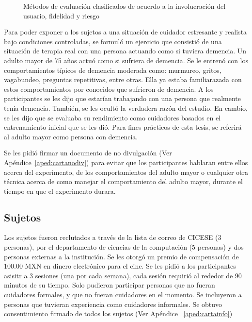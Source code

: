 \begin{figure}[h]
        \centering
        \caption{M\'etodos de evaluaci\'on clasificados de acuerdo a la involucraci\'on del usuario, fidelidad y riesgo}\label{fig:evalmethods}
\end{figure}


Para poder exponer a los sujetos a una situaci\'on de cuidador estresante y realista bajo condiciones controladas, se formul\'o un ejercicio que consisti\'o de una situaci\'on de terapia real con una persona actuando como si tuviera demencia. Un adulto mayor de 75 a\~nos actu\'o como si sufriera de demencia. Se le entren\'o con los comportamientos t\'ipicos de demencia moderada como: murmureo, gritos, vagabundeo, preguntas repetitivas, entre otras. Ella ya estaba familiarazada con estos comportamientos por conocidos que sufrieron de demencia. A los participantes se les dijo que estar\'ian trabajando con una persona que realmente ten\'ia demencia. Tambi\'en, se les ocult\'o la verdadera raz\'on del estudio. En cambio, se les dijo que se evaluaba su rendimiento como cuidadores basados en el entrenamiento inicial que se les di\'o. Para fines pr\'acticos de esta tesis, se referir\'a al adulto mayor como persona con demencia.

Se les pidi\'o firmar un documento de no divulgaci\'on (Ver Ap\'endice~\ref{aped:cartanodiv}) para evitar que los participantes hablaran entre ellos acerca del experimento, de los comportamientos del adulto mayor o cualquier otra t\'ecnica acerca de como manejar el comportamiento del adulto mayor, durante el tiempo en que el experimento durara.

\subsection{Sujetos}\label{secc:subjects}
Los sujetos fueron reclutados a trav\'es de la lista de correo de CICESE (3 personas), por el departamento de ciencias de la computaci\'on (5 personas) y dos personas externas a la instituci\'on. Se les otorg\'o un premio de compensaci\'on de 100.00 MXN en dinero electr\'onico para el cine. Se les pidi\'o a los participantes asisitr a 3 sesiones (una por cada semana), cada sesi\'on requiri\'o al rededor de 90 minutos de su tiempo. Solo pudieron participar personas que no fueran cuidadores formales, y que no fueran cuidadores en el momento. Se incluyeron a personas que tuvieran experiencia como cuidadores informales. Se obtuvo consentimiento firmado de todos los sujetos (Ver Ap\'endice ~\ref{aped:cartainfo})

